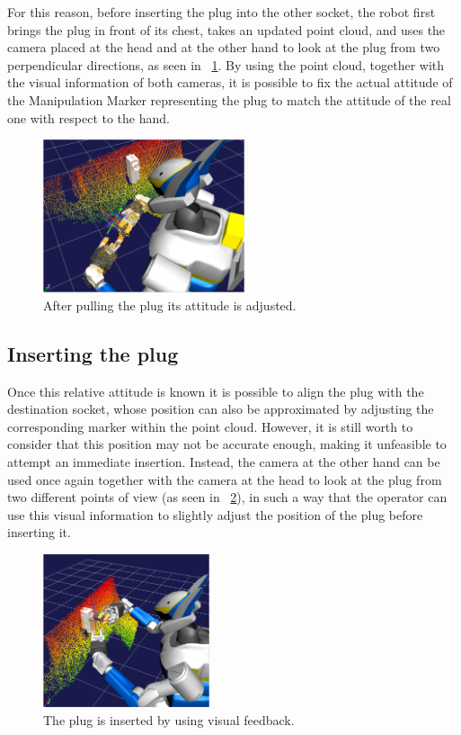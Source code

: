 		For this reason, before inserting the plug into the other socket, the robot first brings the plug
		in front of its chest, takes an updated point cloud, and uses the camera placed at the head and
		at the other hand to look at the plug from two perpendicular directions, as seen in
		\figurename~\ref{fig:WatchPlug}.
		By using the point cloud, together with the visual information of both cameras, it is possible to
		fix the actual attitude of the Manipulation Marker representing the plug to match the attitude of
		the real one with respect to the hand.
		
		\begin{figure}[t]
			\centering
			\includegraphics[height = 4.5cm]{img/WatchPlug}
			\caption{After pulling the plug its attitude is adjusted.}
			\label{fig:WatchPlug}
		\end{figure}
		
	\subsection{Inserting the plug}
		
		Once this relative attitude is known it is possible to align the plug with the destination socket,
		whose position can also be approximated by adjusting the corresponding marker within the point cloud.
		However, it is still worth to consider that this position may not be accurate enough,
		making it unfeasible to attempt an immediate insertion.
		Instead, the camera at the other hand can be used once again together with the camera at the head to
		look at the plug from two different points of view (as seen in \figurename~\ref{fig:InsertPlug}),
		in such a way that the operator can use this visual	information to slightly adjust the position of the
		plug before inserting it.
		
		\begin{figure}[b]
			\centering
			\includegraphics[height = 4.5cm]{img/InsertPlug}
			\caption{The plug is inserted by using visual feedback.}
			\label{fig:InsertPlug}
		\end{figure}
		
